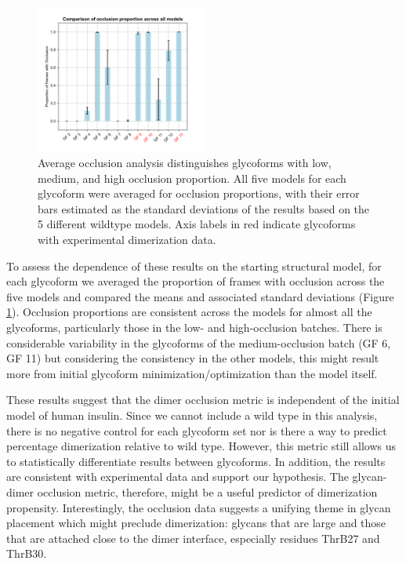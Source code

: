 \documentclass[sn-vancouver]{sn-jnl}
\begin{document}
\begin{figure}[H]
\centering
\includegraphics[width=0.50\textwidth]{Figures/occlusion_proportion_averaged.png}
\caption{Average occlusion analysis distinguishes glycoforms with low, medium, and high occlusion proportion. All five models for each glycoform were averaged for occlusion proportions, with their error bars estimated as the standard deviations of the results based on the 5 different wildtype models. Axis labels in red indicate glycoforms with experimental dimerization data.}
\label{occlusion_results}
\end{figure}

To assess the dependence of these results on the starting structural model, for each glycoform we averaged the proportion of frames with occlusion across the five models and compared the means and associated standard deviations (Figure \ref{occlusion_results}). Occlusion proportions are consistent across the models for almost all the glycoforms, particularly those in the low- and high-occlusion batches. There is considerable variability in the glycoforms of the medium-occlusion batch (GF 6, GF 11) but considering the consistency in the other models, this might result more from initial glycoform minimization/optimization than the model itself.

These results suggest that the dimer occlusion metric is independent of the initial model of human insulin. Since we cannot include a wild type in this analysis, there is no negative control for each glycoform set nor is there a way to predict percentage dimerization relative to wild type. However, this metric still allows us to statistically differentiate results between glycoforms. In addition, the results are consistent with experimental data and support our hypothesis. The glycan-dimer occlusion metric, therefore, might be a useful predictor of dimerization propensity. Interestingly, the occlusion data suggests a unifying theme in glycan placement which might preclude dimerization: glycans that are large and those that are attached close to the dimer interface, especially residues ThrB27 and ThrB30.
\end{document}
